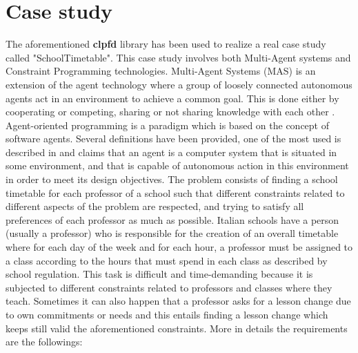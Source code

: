 \section{Case study}\label{sec:case_study}

The aforementioned \textbf{clpfd} library has been used to realize a real case study called "SchoolTimetable".
This case study involves both Multi-Agent systems and Constraint Programming technologies.\newline\newline
Multi-Agent Systems (MAS) is an extension of the agent technology where a group of loosely connected autonomous agents act in an environment to achieve a common goal. This is done either by cooperating or competing, sharing or not sharing knowledge with each other \cite{inbook}.
Agent-oriented programming is a paradigm which is based on the concept of software agents. Several definitions have been provided, one of the most used is described in \cite{10.5555/1695886} and claims that an agent is a computer system that is situated in some environment,
and that is capable of autonomous action in this environment in order
to meet its design objectives.\newline\newline
The problem consists of finding a school timetable for each professor of a school such that different constraints related to different aspects of the problem are respected,
and trying to satisfy all preferences of each professor as much as possible.\newline\newline
Italian schools have a person (usually a professor) who is responsible for the creation of an overall timetable where for each day of the week and for each hour,
a professor must be assigned to a class according to the hours that must spend in each class as described by school regulation. This task is difficult and time-demanding because it is subjected to different constraints related to professors and classes where they teach.
Sometimes it can also happen that a professor asks for a lesson change due to own commitments or needs and this entails finding a lesson change which keeps still valid the aforementioned constraints.\newline
More in details the requirements are the followings:
